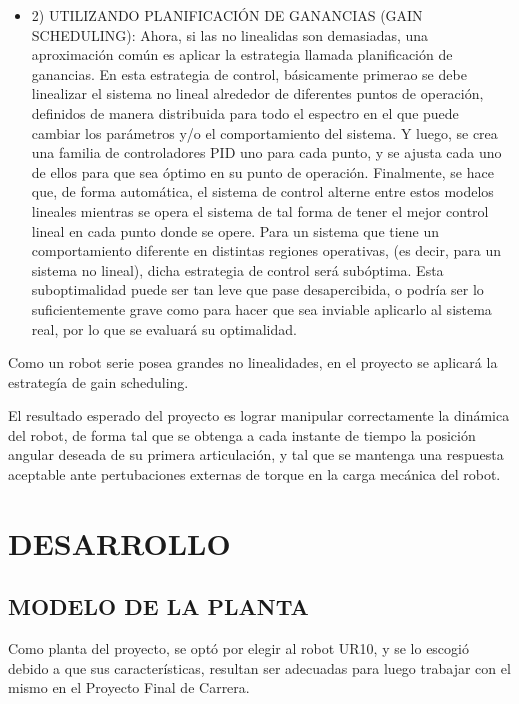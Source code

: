 \documentclass{article}
\begin{document}
\begin{sloppypar}
\begin{itemize}
    \item 2) UTILIZANDO PLANIFICACIÓN DE GANANCIAS (GAIN SCHEDULING): Ahora, si las no linealidas son demasiadas, una aproximación común es aplicar la estrategia llamada planificación de ganancias. En esta estrategia de control, básicamente primerao se debe linealizar el sistema no lineal alrededor de diferentes puntos de operación, definidos de manera distribuida para todo el espectro en el que puede cambiar los parámetros y/o el comportamiento del sistema. Y luego, se crea una familia de controladores PID uno para cada punto, y se ajusta cada uno de ellos para que sea óptimo en su punto de operación. Finalmente, se hace que, de forma automática, el sistema de control alterne entre estos modelos lineales mientras se opera el sistema de tal forma de tener el mejor control lineal en cada punto donde se opere.
    Para un sistema que tiene un comportamiento diferente en distintas regiones operativas, (es decir, para un sistema no lineal), dicha estrategia de control será subóptima. Esta suboptimalidad puede ser tan leve que pase desapercibida, o podría ser lo suficientemente grave como para hacer que sea inviable aplicarlo al sistema real, por lo que se evaluará su optimalidad.
\end{itemize}

Como un robot serie posea grandes no linealidades, en el proyecto se aplicará la estrategía de gain scheduling.

El resultado esperado del proyecto es lograr manipular correctamente la dinámica del robot, de forma tal que se obtenga a cada instante de tiempo la posición angular deseada de su primera articulación, y tal que se mantenga una respuesta aceptable ante pertubaciones externas de torque en la carga mecánica del robot.



\section{DESARROLLO}
\label{sec:DESARROLLO}

\subsection{MODELO DE LA PLANTA}
\label{sec:MODELO DE LA PLANTA}

Como planta del proyecto, se optó por elegir al robot UR10, y se lo escogió debido a que sus características, resultan ser adecuadas para luego trabajar con el mismo en el Proyecto Final de Carrera.


\end{sloppypar}
\end{document}
